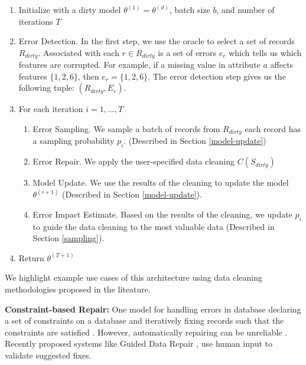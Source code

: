\begin{enumerate}
\item Initialize with a dirty model $\theta^{(1)} = \theta^{(d)}$, batch size $b$, and number of iterations $T$
\item Error Detection. In the first step, we use the oracle to select a set of records $R_{dirty}$.
Associated with each $r \in R_{dirty}$ is a set of errors $e_r$ which tells us which features are corrupted.
For example, if a missing value in attribute $a$ affects features $\{1,2,6\}$, then $e_r=\{1,2,6\}$.
The error detection step gives us the following tuple: $(R_{dirty},E_r)$.

\item For each iteration $i=1,...,T$

\begin{enumerate}
\item Error Sampling. We sample a batch of records from $R_{dirty}$ each record has a sampling probability $p_i$. (Described in Section \ref{model-update})
\item Error Repair. We apply the user-specified data cleaning $C(S_{dirty})$
\item Model Update. We use the results of the cleaning to update the model $\theta^{(i+1)}$ (Described in Section \ref{model-update}).
\item Error Impact Estimate. Based on the results of the cleaning, we update $p_i$ to guide the data cleaning to the most valuable data (Described in Section \ref{sampling}).
\end{enumerate}
\item Return $\theta^{(T+1)}$
\end{enumerate}

\noindent We highlight example use cases of this architecture using data cleaning methodologies proposed in the liteature.

\vspace{0.5em}

\noindent\textbf{Constraint-based Repair: }
One model for handling errors in database declaring a set of constraints on a database and 
iteratively fixing records such that the constraints are satisfied \cite{DBLP:journals/pvldb/YakoutENOI11, DBLP:journals/pvldb/FanLMTY10, khayyat2015bigdansing}.
However, automatically repairing can be unreliable \cite{DBLP:journals/pvldb/FanLMTY10}.
Recently proposed systems like Guided Data Repair \cite{DBLP:journals/pvldb/YakoutENOI11}, use human input to validate suggested fixes.

